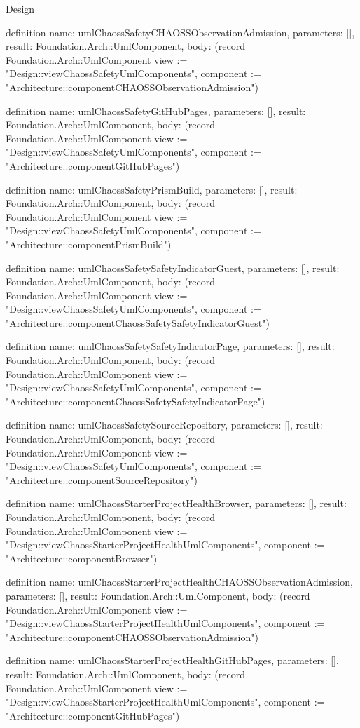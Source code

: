 \begin{lexlean}{Design}
\begin{semanticmodule}
definition{
  name: umlChaossSafetyCHAOSSObservationAdmission,
  parameters: [],
  result: Foundation.Arch::UmlComponent,
  body: (record Foundation.Arch::UmlComponent {view := "Design::viewChaossSafetyUmlComponents", component := "Architecture::componentCHAOSSObservationAdmission"})
}

definition{
  name: umlChaossSafetyGitHubPages,
  parameters: [],
  result: Foundation.Arch::UmlComponent,
  body: (record Foundation.Arch::UmlComponent {view := "Design::viewChaossSafetyUmlComponents", component := "Architecture::componentGitHubPages"})
}

definition{
  name: umlChaossSafetyPrismBuild,
  parameters: [],
  result: Foundation.Arch::UmlComponent,
  body: (record Foundation.Arch::UmlComponent {view := "Design::viewChaossSafetyUmlComponents", component := "Architecture::componentPrismBuild"})
}

definition{
  name: umlChaossSafetySafetyIndicatorGuest,
  parameters: [],
  result: Foundation.Arch::UmlComponent,
  body: (record Foundation.Arch::UmlComponent {view := "Design::viewChaossSafetyUmlComponents", component := "Architecture::componentChaossSafetySafetyIndicatorGuest"})
}

definition{
  name: umlChaossSafetySafetyIndicatorPage,
  parameters: [],
  result: Foundation.Arch::UmlComponent,
  body: (record Foundation.Arch::UmlComponent {view := "Design::viewChaossSafetyUmlComponents", component := "Architecture::componentChaossSafetySafetyIndicatorPage"})
}

definition{
  name: umlChaossSafetySourceRepository,
  parameters: [],
  result: Foundation.Arch::UmlComponent,
  body: (record Foundation.Arch::UmlComponent {view := "Design::viewChaossSafetyUmlComponents", component := "Architecture::componentSourceRepository"})
}

definition{
  name: umlChaossStarterProjectHealthBrowser,
  parameters: [],
  result: Foundation.Arch::UmlComponent,
  body: (record Foundation.Arch::UmlComponent {view := "Design::viewChaossStarterProjectHealthUmlComponents", component := "Architecture::componentBrowser"})
}

definition{
  name: umlChaossStarterProjectHealthCHAOSSObservationAdmission,
  parameters: [],
  result: Foundation.Arch::UmlComponent,
  body: (record Foundation.Arch::UmlComponent {view := "Design::viewChaossStarterProjectHealthUmlComponents", component := "Architecture::componentCHAOSSObservationAdmission"})
}

definition{
  name: umlChaossStarterProjectHealthGitHubPages,
  parameters: [],
  result: Foundation.Arch::UmlComponent,
  body: (record Foundation.Arch::UmlComponent {view := "Design::viewChaossStarterProjectHealthUmlComponents", component := "Architecture::componentGitHubPages"})
}


\end{semanticmodule}
\end{lexlean}
